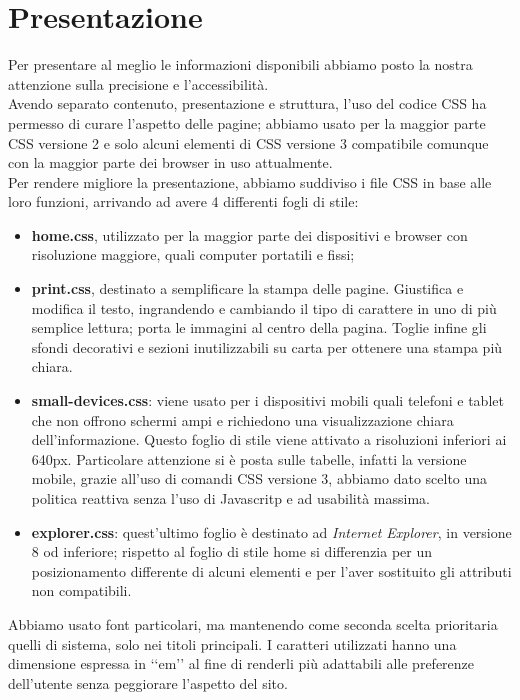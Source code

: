 \section{Presentazione}{
	Per presentare al meglio le informazioni disponibili abbiamo posto la nostra attenzione sulla precisione e l'accessibilità.\\
	Avendo separato contenuto, presentazione e struttura, l'uso del codice CSS ha permesso di curare l'aspetto delle pagine; abbiamo usato per la maggior parte CSS versione 2 e solo alcuni elementi di CSS versione 3 compatibile comunque con la maggior parte dei browser in uso attualmente.\\
	Per rendere migliore la presentazione, abbiamo suddiviso i file CSS in base alle loro funzioni, arrivando ad avere 4 differenti fogli di stile:
	\begin{itemize}
		\item \textbf{home.css}, utilizzato per la maggior parte dei dispositivi e browser con risoluzione maggiore, quali computer portatili e fissi;
		\item \textbf{print.css}, destinato a semplificare la stampa delle pagine.
		Giustifica e modifica il testo, ingrandendo e cambiando il tipo di carattere in uno di più semplice lettura; porta le immagini al centro della pagina. Toglie infine gli sfondi decorativi e sezioni inutilizzabili su carta per ottenere una stampa più chiara.
		\item \textbf{small-devices.css}: viene usato per i dispositivi mobili quali telefoni e tablet che non offrono schermi ampi e richiedono una visualizzazione chiara dell'informazione. Questo foglio di stile viene attivato a risoluzioni inferiori ai 640px. Particolare attenzione si è posta sulle tabelle, infatti la versione mobile, grazie all'uso di comandi CSS versione 3, abbiamo dato scelto una politica reattiva senza l'uso di Javascritp e ad usabilità massima. 
		\item \textbf{explorer.css}: quest'ultimo foglio è destinato ad \textit{Internet Explorer}, in versione 8 od inferiore; rispetto al foglio di stile home si differenzia per un posizionamento differente di alcuni elementi e per l'aver sostituito gli attributi non compatibili.
	\end{itemize}
	Abbiamo usato font particolari, ma mantenendo come seconda scelta prioritaria quelli di sistema, solo nei titoli principali. I caratteri utilizzati hanno una dimensione espressa in ‘‘em’’ al fine di renderli più adattabili alle preferenze dell'utente senza peggiorare l'aspetto del sito.
}
